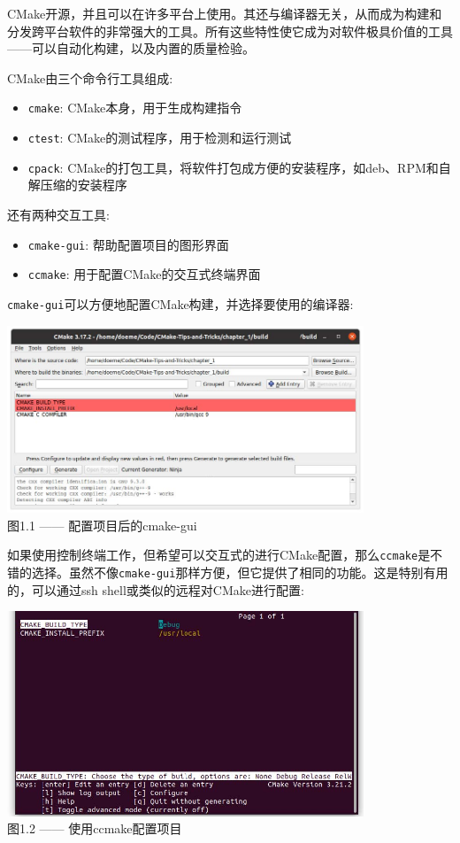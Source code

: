 CMake开源，并且可以在许多平台上使用。其还与编译器无关，从而成为构建和分发跨平台软件的非常强大的工具。所有这些特性使它成为对软件极具价值的工具——可以自动化构建，以及内置的质量检验。

CMake由三个命令行工具组成:

\begin{itemize}
\item 
\texttt{cmake}: CMake本身，用于生成构建指令

\item 
\texttt{ctest}: CMake的测试程序，用于检测和运行测试

\item 
\texttt{cpack}: CMake的打包工具，将软件打包成方便的安装程序，如deb、RPM和自解压缩的安装程序
\end{itemize}

还有两种交互工具:

\begin{itemize}
\item 
\texttt{cmake-gui}: 帮助配置项目的图形界面

\item 
\texttt{ccmake}: 用于配置CMake的交互式终端界面
\end{itemize}

\texttt{cmake-gui}可以方便地配置CMake构建，并选择要使用的编译器:

\begin{center}
\includegraphics[width=0.8\textwidth]{content/1/chapter1/images/1.jpg}\\
图1.1 —— 配置项目后的cmake-gui
\end{center}

如果使用控制终端工作，但希望可以交互式的进行CMake配置，那么\texttt{ccmake}是不错的选择。虽然不像\texttt{cmake-gui}那样方便，但它提供了相同的功能。这是特别有用的，可以通过ssh shell或类似的远程对CMake进行配置:

\begin{center}
\includegraphics[width=0.8\textwidth]{content/1/chapter1/images/2.jpg}\\
图1.2 —— 使用ccmake配置项目
\end{center}

